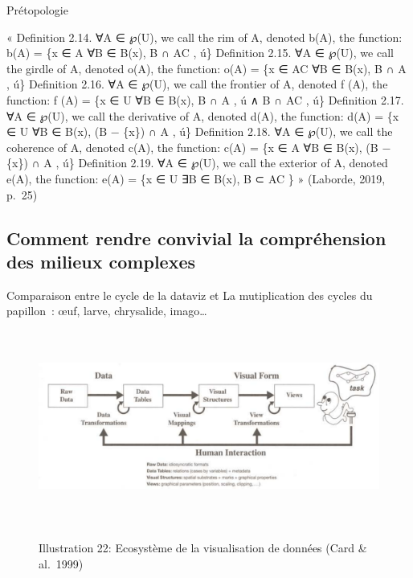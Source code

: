 \documentclass[
  a4paper,
  DIV=11,
  numbers=noendperiod]{scrreprt}
\begin{document}
Prétopologie

« Definition 2.14. ∀A ∈ ℘(U), we call the rim of A, denoted b(A), the
function: b(A) = \{x ∈ A \textbar{} ∀B ∈ B(x), B ∩ AC , ú\} Definition
2.15. ∀A ∈ ℘(U), we call the girdle of A, denoted o(A), the function:
o(A) = \{x ∈ AC \textbar{} ∀B ∈ B(x), B ∩ A , ú\} Definition 2.16. ∀A ∈
℘(U), we call the frontier of A, denoted f (A), the function: f (A) =
\{x ∈ U \textbar{} ∀B ∈ B(x), B ∩ A , ú ∧ B ∩ AC , ú\} Definition 2.17.
∀A ∈ ℘(U), we call the derivative of A, denoted d(A), the function: d(A)
= \{x ∈ U \textbar{} ∀B ∈ B(x), (B − \{x\}) ∩ A , ú\} Definition 2.18.
∀A ∈ ℘(U), we call the coherence of A, denoted c(A), the function: c(A)
= \{x ∈ A \textbar{} ∀B ∈ B(x), (B − \{x\}) ∩ A , ú\} Definition 2.19.
∀A ∈ ℘(U), we call the exterior of A, denoted e(A), the function: e(A) =
\{x ∈ U \textbar{} ∃B ∈ B(x), B ⊂ AC \} » (Laborde, 2019, p.~25)

\subsection{Comment rendre convivial la compréhension des milieux
complexes}\label{comment-rendre-convivial-la-compruxe9hension-des-milieux-complexes}

Comparaison entre le cycle de la dataviz et La mutiplication des cycles
du papillon~: œuf, larve, chrysalide, imago\ldots{}

\begin{figure}[H]

{\centering \includegraphics[width=17cm,height=6.276cm]{media/100000010000049D000001B4653BE7F72C3CCD80.png}

}

\caption{\\
Illustration 22: Ecosystème de la visualisation de données (Card \&
al.~1999)}

\end{figure}%
\end{document}
